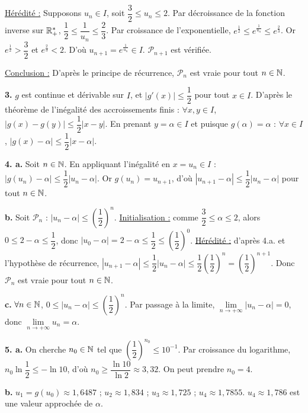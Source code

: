 \documentclass[11pt]{article}
\begin{document}
\underline{Hérédité :} Supposons $u_n \in I$, soit $\dfrac{3}{2} \le u_n \le 2$. Par décroissance de la fonction inverse sur $\mathbb{R}_+^*$, $\dfrac{1}{2} \le \dfrac{1}{u_n} \le \dfrac{2}{3}$. Par croissance de l'exponentielle, $e^{\frac{1}{2}} \le e^{\frac{1}{u_n}} \le e^{\frac{2}{3}}$. Or $e^{\frac{1}{2}} > \dfrac{3}{2}$ et $e^{\frac{2}{3}} < 2$. D'où $u_{n+1} = e^{\frac{1}{u_n}} \in I$. $\mathcal{P}_{n+1}$ est vérifiée.

\underline{Conclusion :} D'après le principe de récurrence, $\mathcal{P}_n$ est vraie pour tout $n \in \mathbb{N}$.

\textbf{3.} $g$ est continue et dérivable sur $I$, et $|g'(x)| \le \dfrac{1}{2}$ pour tout $x \in I$. D'après le théorème de l'inégalité des accroissements finis : $\forall x, y \in I$, $|g(x) - g(y)| \le \dfrac{1}{2}|x - y|$. En prenant $y = \alpha \in I$ et puisque $g(\alpha) = \alpha$ : $\forall x \in I$, $|g(x) - \alpha| \le \dfrac{1}{2}|x - \alpha|$.

\textbf{4. a.} Soit $n \in \mathbb{N}$. En appliquant l'inégalité en $x = u_n \in I$ : $|g(u_n) - \alpha| \le \dfrac{1}{2}|u_n - \alpha|$. Or $g(u_n) = u_{n+1}$, d'où $|u_{n+1} - \alpha| \le \dfrac{1}{2}|u_n - \alpha|$ pour tout $n \in \mathbb{N}$.

\textbf{b.} Soit $\mathcal{P}_n$ : $|u_n - \alpha| \le \left(\dfrac{1}{2}\right)^n$. \underline{Initialisation :} comme $\dfrac{3}{2} \le \alpha \le 2$, alors $0 \le 2 - \alpha \le \dfrac{1}{2}$, donc $|u_0 - \alpha| = 2 - \alpha \le \dfrac{1}{2} \le \left(\dfrac{1}{2}\right)^0$. \underline{Hérédité :} d'après 4.a. et l'hypothèse de récurrence, $|u_{n+1} - \alpha| \le \dfrac{1}{2}|u_n - \alpha| \le \dfrac{1}{2}\left(\dfrac{1}{2}\right)^n = \left(\dfrac{1}{2}\right)^{n+1}$. Donc $\mathcal{P}_n$ est vraie pour tout $n \in \mathbb{N}$.

\textbf{c.} $\forall n \in \mathbb{N}$, $0 \le |u_n - \alpha| \le \left(\dfrac{1}{2}\right)^n$. Par passage à la limite, $\lim\limits_{n\to+\infty}|u_n - \alpha| = 0$, donc $\lim\limits_{n\to+\infty} u_n = \alpha$.

\textbf{5. a.} On cherche $n_0 \in \mathbb{N}$ tel que $\left(\dfrac{1}{2}\right)^{n_0} \le 10^{-1}$. Par croissance du logarithme, $n_0\ln\dfrac{1}{2} \le -\ln 10$, d'où $n_0 \ge \dfrac{\ln 10}{\ln 2} \approx 3{,}32$. On peut prendre $n_0 = 4$.

\textbf{b.} $u_1 = g(u_0) \approx 1{,}6487$ ; $u_2 \approx 1{,}834$ ; $u_3 \approx 1{,}725$ ; $u_4 \approx 1{,}7855$. $u_4 \approx 1{,}786$ est une valeur approchée de $\alpha$.
\end{document}
